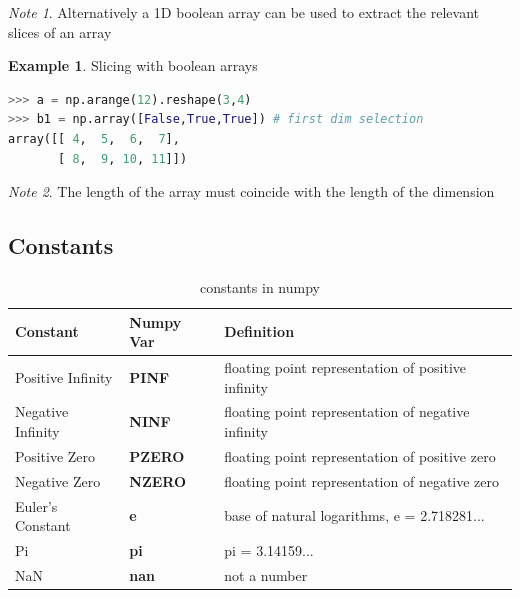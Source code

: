 \documentclass{article}
\theoremstyle{definition}
\newtheorem{ex}{Example}[subsection]
\theoremstyle{remark}
\newtheorem*{nb}{Note}
\begin{document}
\begin{nb}
Alternatively a 1D boolean array can be used to extract the relevant slices of an array
\end{nb}

\begin{ex}Slicing with boolean arrays
\begin{lstlisting}[language=Python]
>>> a = np.arange(12).reshape(3,4)
>>> b1 = np.array([False,True,True]) # first dim selection
array([[ 4,  5,  6,  7],
       [ 8,  9, 10, 11]])
\end{lstlisting}
\end{ex}

\begin{nb}
The length of the array must coincide with the length of the dimension
\end{nb}


\break


\subsection{Constants}

\begin{table}[h!]
    \def\arraystretch{1.1}%
    \centering
    \begin{tabular}{p{4cm} p{2cm} p{6cm}}
	Constant & Numpy Var & Definition \\
	\hline
	Positive Infinity & \footnotesize{\textbf{PINF}} & floating point representation of positive infinity \\ 
	Negative Infinity & \footnotesize{\textbf{NINF}} & floating point representation of negative infinity \\
	Positive Zero & \footnotesize{\textbf{PZERO}} & floating point representation of positive zero \\
	Negative Zero & \footnotesize{\textbf{NZERO}} & floating point representation of negative zero \\ 
	Euler's Constant & \footnotesize{\textbf{e}} & base of natural logarithms, e = 2.718281... \\
	Pi & \footnotesize{\textbf{pi}} & pi = 3.14159... \\
	NaN & \footnotesize{\textbf{nan}} & not a number \\
    	\hline
    \end{tabular}
\caption{constants in numpy}
\label{table:2}
\end{table}




\break
\end{document}
